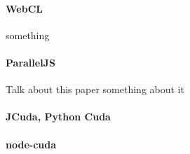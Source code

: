 
\paragraph{WebCL}
something

\paragraph{ParallelJS}
Talk about this paper \cite{parallelJS} something about it

\paragraph{JCuda, Python Cuda}

\paragraph{node-cuda}
